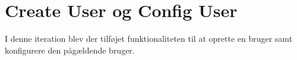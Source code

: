 \section{Create User og Config User}

I denne iteration blev der tilføjet funktionaliteten til at oprette en bruger samt konfigurere den pågældende bruger. 